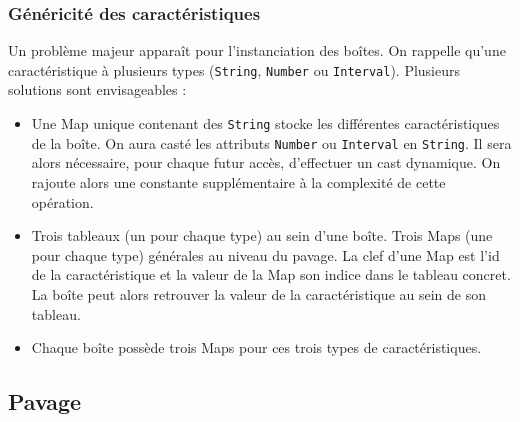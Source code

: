 
\subsubsection{Généricité des caractéristiques}
Un problème majeur apparaît pour l'instanciation des boîtes. On rappelle qu'une caractéristique à plusieurs types (\verb+String+, \verb+Number+ ou \verb+Interval+). Plusieurs solutions sont envisageables : 
\begin{itemize}
\item
  Une Map unique contenant des \verb+String+ stocke les différentes caractéristiques de la boîte. On aura casté les attributs \verb+Number+ ou \verb+Interval+ en \verb+String+. Il sera alors nécessaire, pour chaque futur accès, d'effectuer un cast dynamique. On rajoute alors une constante supplémentaire à la complexité de cette opération. 
\item 
Trois tableaux (un pour chaque type) au sein d'une boîte. Trois Maps (une pour chaque type) \og générales \fg{} au niveau du pavage. La clef d'une Map est l'id de la caractéristique et la valeur de la Map son indice dans le tableau concret. La boîte peut alors retrouver la valeur de la caractéristique au sein de son tableau.
\item 
  Chaque boîte possède trois Maps pour ces trois types de caractéristiques. 
\end{itemize}


\subsection{Pavage}
